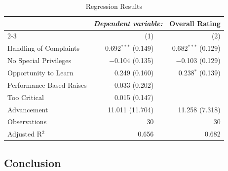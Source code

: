 \documentclass[12pt]{article}
\begin{document}
\begin{table}[h!]
  \caption{Regression Results}
  \label{tab:reg1}
  \begin{center}
    \begin{tabular}{@{} lrr @{}}
      \toprule
      & \multicolumn{2}{c}{\textit{Dependent variable:} \ Overall Rating} \\
      \cmidrule{2-3}
                                & (1)                   & (2)                   \\
      \hline

      Handling of Complaints   & 0.692$^{***}$ (0.149) & 0.682$^{***}$ (0.129) \\
      No Special Privileges    & $-$0.104 (0.135)      & $-$0.103 (0.129)      \\
      Opportunity to Learn     & 0.249 (0.160)         & 0.238$^{*}$ (0.139)   \\
      Performance-Based Raises & $-$0.033 (0.202)      &                       \\
      Too Critical             & 0.015 (0.147)         &                       \\
      Advancement              & 11.011 (11.704)       & 11.258 (7.318)        \\
      \hline
      Observations             & 30                    & 30                    \\
      Adjusted R$^{2}$         & 0.656                 & 0.682                 \\

      \bottomrule
    \end{tabular}

  \end{center}
\end{table}


\subsection{Conclusion}
\end{document}

